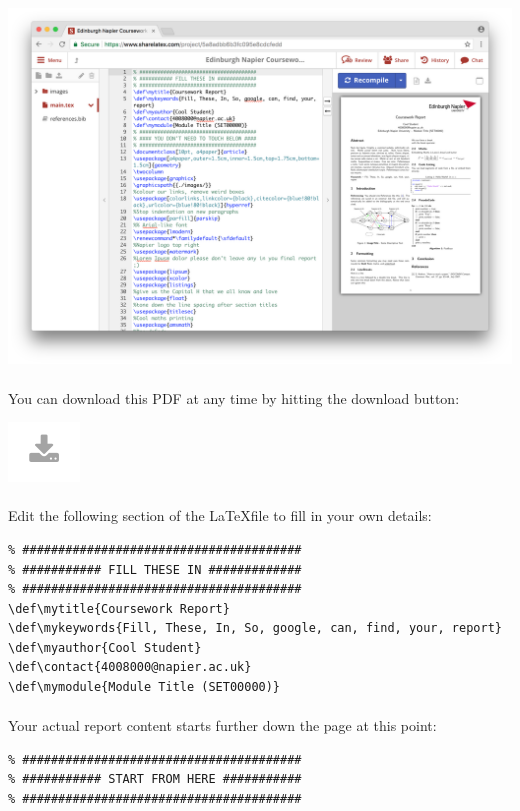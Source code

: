 \documentclass[10pt, a4paper, twosize]{article}
\begin{document}
\includegraphics[width=.8\textwidth]{images/latex_ui}

\paragraph{} You can download this PDF at any time by hitting the download button:

\includegraphics[width=.2\textwidth]{images/latex_download-icon}

\paragraph{} Edit the following section of the \LaTeX file to fill in your own details:

\begin{lstlisting}
% #######################################
% ########### FILL THESE IN #############
% #######################################
\def\mytitle{Coursework Report}
\def\mykeywords{Fill, These, In, So, google, can, find, your, report}
\def\myauthor{Cool Student}
\def\contact{4008000@napier.ac.uk}
\def\mymodule{Module Title (SET00000)}
\end{lstlisting}

\paragraph{} Your actual report content starts further down the page at this point:

\begin{lstlisting}
% #######################################
% ########### START FROM HERE ###########
% #######################################
\end{lstlisting}
\end{document}
